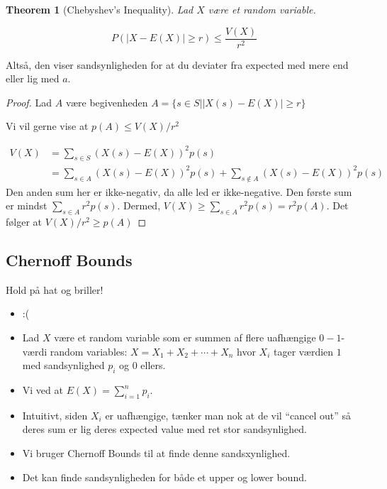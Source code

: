 \documentclass[11pt]{article}
\newtheorem{theorem}{Theorem}
\theoremstyle{definition}
\theoremstyle{remark}
\begin{document}
\begin{theorem}[Chebyshev's Inequality]
  Lad $X$ være et random variable.

  \[
P(|X - E(X)| \geq r) \leq \frac{V(X)}{r^{2}}
  \]
\end{theorem}
Altså, den viser sandsynligheden for at du deviater fra expected med mere end eller lig med $a$.
\begin{proof}

  Lad $A$ være begivenheden $A = \{s \in S | |X(s) - E(X) | \geq r\}$

  Vi vil gerne vise at $p(A) \leq V(X)/r^{2}$

  \begin{equation}
\begin{split}
  V(X) &= \sum_{s \in S}^{} (X(s) - E(X))^{2}p(s) \\
  &= \sum_{s \in A}^{}(X(s) - E(X))^{2}p(s) + \sum_{s \notin A}^{}(X(s) - E(X))^{2}p(s)
\end{split}
  \end{equation}
Den anden sum her er ikke-negativ, da alle led er ikke-negative. Den første sum er mindst $\sum_{s \in A}^{}r^{2}p(s)$. Dermed, $V(X) \geq \sum_{s \in A}^{}r^{2}p(s) = r^{2}p(A)$. Det følger at $V(X)/r^{2} \geq p(A)$
  
\end{proof}

\subsection{Chernoff Bounds}
\label{subsec:label}

Hold på hat og briller!

\begin{itemize}
  \item :(
  \item Lad $X$ være et random variable som er summen af flere uafhængige $0-1$-værdi random variables: $X = X_{1} + X_{2} + \cdots + X_{n}$ hvor $X_{i}$ tager værdien $1$ med sandsynlighed $p_{i}$ og 0 ellers. 
  \item Vi ved at $E(X) = \sum_{i=1}^{n}p_{i}$. 
  \item Intuitivt, siden $X_{i}$ er uafhængige, tænker man nok at de vil ``cancel out'' så deres sum er lig deres expected value med ret stor sandsynlighed. 
  \item Vi bruger Chernoff Bounds til at finde denne sandsxynlighed.
  \item Det kan finde sandsynligheden for både et upper og lower bound. 
  \end{itemize}
\end{document}
